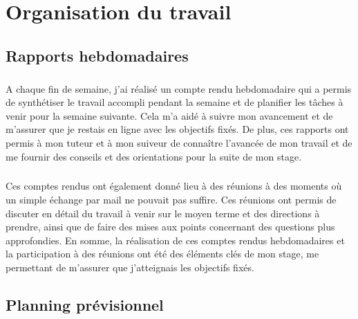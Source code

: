 \chapter{Organisation du travail}

\section{Rapports hebdomadaires}

\paragraph{} \hspace{10mm}
A chaque fin de semaine, j'ai réalisé un compte rendu hebdomadaire qui a permis de synthétiser le travail accompli pendant la semaine et de planifier les tâches à venir pour la semaine suivante. Cela m'a aidé à suivre mon avancement et de m'assurer que je restais en ligne avec les objectifs fixés. De plus, ces rapports ont permis à mon tuteur et à mon suiveur de connaître l'avancée de mon travail et de me fournir des conseils et des orientations pour la suite de mon stage.
\paragraph{} \hspace{10mm}
Ces comptes rendus ont également donné lieu à des réunions à des moments où un simple échange par mail ne pouvait pas suffire. Ces réunions ont permis de discuter en détail du travail à venir sur le moyen terme et des directions à prendre, ainsi que de faire des mises aux points concernant des questions plus approfondies. 
En somme, la réalisation de ces comptes rendus hebdomadaires et la participation à des réunions ont été des éléments clés de mon stage, me permettant de m'assurer que j'atteignais les objectifs fixés.

\section{Planning prévisionnel}


